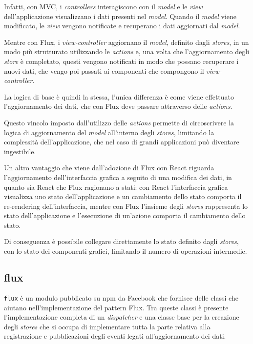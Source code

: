 Infatti, con MVC, i \textit{controllers} interagiscono con il \textit{model} e le \textit{view} dell'applicazione visualizzano i dati presenti nel \textit{model}.
Quando il \textit{model} viene modificato, le \textit{view} vengono notificate e recuperano i dati aggiornati dal \textit{model}.

Mentre con Flux, i \textit{view-controller} aggiornano il \textit{model}, definito dagli \textit{stores}, in un modo più strutturato utilizzando le \textit{actions} e, una volta che l'aggiornamento degli \textit{store} è completato, questi vengono notificati in modo che possano recuperare i nuovi dati, che vengo poi passati ai componenti che compongono il \textit{view-controller}.

La logica di base è quindi la stessa, l'unica differenza è come viene effettuato l'aggiornamento dei dati, che con Flux deve passare attraverso delle \textit{actions}.

Questo vincolo imposto dall'utilizzo delle \textit{actions} permette di circoscrivere la logica di aggiornamento del \textit{model} all'interno degli \textit{stores}, limitando la complessità dell'applicazione, che nel caso di grandi applicazioni può diventare ingestibile.

Un altro vantaggio che viene dall'adozione di Flux con React riguarda l'aggiornamento dell'interfaccia grafica a seguito di una modifica dei dati, in quanto sia React che Flux ragionano a stati: con React l'interfaccia grafica visualizza uno stato dell'applicazione e un cambiamento dello stato comporta il re-rendering dell'interfaccia, mentre con Flux l'insieme degli \textit{stores} rappresenta lo stato dell'applicazione e l'esecuzione di un'azione comporta il cambiamento dello stato.

Di conseguenza è possibile collegare direttamente lo stato definito dagli \textit{stores}, con lo stato dei componenti grafici, limitando il numero di operazioni intermedie.

\subsection{flux}\label{sec:flux-npm}

\texttt{flux} è un modulo pubblicato su npm da Facebook che fornisce delle classi che aiutano nell'implementazione del pattern Flux.
Tra queste classi è presente l'implementazione completa di un \textit{dispatcher} e una classe base per la creazione degli \textit{stores} che si occupa di implementare tutta la parte relativa alla registrazione e pubblicazioni degli eventi legati all'aggiornamento dei dati.


